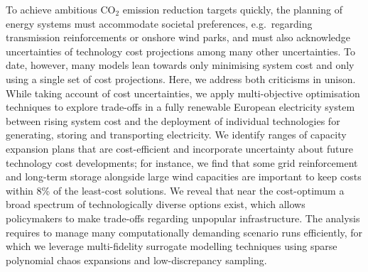 To achieve ambitious CO$_2$ emission reduction targets quickly, the planning of
energy systems must accommodate societal preferences, e.g.~regarding
transmission reinforcements or onshore wind parks, and must also acknowledge
uncertainties of technology cost projections among many other uncertainties. To
date, however, many models lean towards only minimising system cost and only
using a single set of cost projections. Here, we address both criticisms in
unison. While taking account of cost uncertainties, we apply multi-objective
optimisation techniques to explore trade-offs in a fully renewable European
electricity system between rising system cost and the deployment of individual
technologies for generating, storing and transporting electricity. We identify
ranges of capacity expansion plans that are cost-efficient and incorporate
uncertainty about future technology cost developments; for instance, we find
that some grid reinforcement and long-term storage alongside large wind
capacities are important to keep costs within 8\% of the least-cost solutions.
We reveal that near the cost-optimum a broad spectrum of technologically diverse
options exist, which allows policymakers to make trade-offs regarding unpopular
infrastructure. The analysis requires to manage many computationally demanding
scenario runs efficiently, for which we leverage multi-fidelity surrogate
modelling techniques using sparse polynomial chaos expansions and
low-discrepancy sampling.

